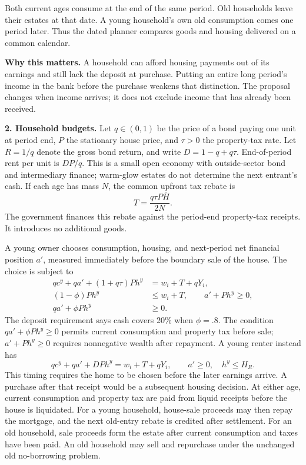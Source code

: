 \documentclass[11pt]{article}
\begin{document}
Both current ages consume at the end of the same period. Old households
leave their estates at that date. A young household's own old consumption
comes one period later. Thus the dated planner compares goods and housing
delivered on a common calendar.

\textbf{Why this matters.}
A household can afford housing payments out of its earnings and still lack
the deposit at purchase. Putting an entire long period's income in the bank
before the purchase weakens that distinction. The proposal changes when
income arrives; it does not exclude income that has already been received.

\newpage
\textbf{2. Household budgets.}
Let $q\in(0,1)$ be the price of a bond paying one unit at period end, $P$ the
stationary house price, and $\tau>0$ the property-tax rate. Let $R=1/q$ denote
the gross bond return, and write $D=1-q+q\tau$. End-of-period rent per unit is
$DP/q$.
This is a small open economy with outside-sector bond and intermediary finance;
warm-glow estates do not determine the next entrant's cash.
If each age has mass $N$, the common upfront tax rebate is
\[
T=\frac{q\tau P\bar H}{2N}.
\]
The government finances this rebate against the period-end property-tax
receipts. It introduces no additional goods.

A young owner chooses consumption, housing, and next-period net financial
position $a'$, measured immediately before the boundary sale of the house.
The choice is subject to
\[
\boxed{\begin{aligned}
qc^y+qa'+(1+q\tau)Ph^y&=w_i+T+qY_i,\\
(1-\phi)Ph^y&\le w_i+T,\qquad a'+Ph^y\ge0,\\
qa'+\phi Ph^y&\ge0.
\end{aligned}}
\]
The deposit requirement says cash covers 20\% when $\phi=.8$. The condition
$qa'+\phi Ph^y\ge0$ permits current consumption and property tax before
sale; $a'+Ph^y\ge0$ requires nonnegative wealth after repayment. A young
renter instead has
\[
qc^y+qa'+DP h^y=w_i+T+qY_i,
\qquad a'\ge0,\quad h^y\le H_R.
\]
This timing requires the home to be chosen before the later earnings arrive.
A purchase after that receipt would be a subsequent housing decision. At
either age, current consumption and property tax are paid from liquid receipts
before the house is liquidated. For a young household, house-sale proceeds may
then repay the mortgage, and the next old-entry rebate is credited after
settlement. For an old household, sale proceeds form the estate after current
consumption and taxes have been paid.
An old household may sell and repurchase under the unchanged old no-borrowing
problem.
\end{document}
